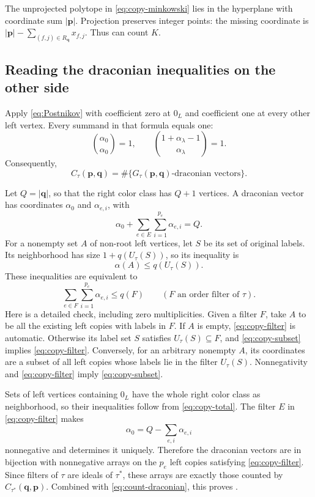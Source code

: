 \documentclass[11pt,letterpaper]{article}
\theoremstyle{definition}
\newcommand{\pvec}{\mathbf p}
\newcommand{\qvec}{\mathbf q}
\newcommand{\sumv}[1]{\lvert #1\rvert}
\begin{document}
The unprojected polytope in \eqref{eq:copy-minkowski} lies in the hyperplane
with coordinate sum $\sumv{\pvec}$. Projection preserves integer points:
the missing coordinate is
$\sumv{\pvec}-\sum_{(f,j)\in R_{\qvec}}x_{f,j}$.
Thus  can count $K$.

\subsection{Reading the draconian inequalities on the other side}
Apply \eqref{eq:Postnikov} with coefficient zero at $0_L$ and coefficient
one at every other left vertex. Every summand in that formula equals one:
\[
 \binom{\alpha_0}{\alpha_0}=1,\qquad
 \binom{1+\alpha_\lambda-1}{\alpha_\lambda}=1.
\]
Consequently,
\begin{equation}\label{eq:count-draconian}
 C_\tau(\pvec,\qvec)=\#\{G_\tau(\pvec,\qvec)\text{-draconian vectors}\}.
\end{equation}

Let $Q=\sumv{\qvec}$, so that the right color class has $Q+1$ vertices.
A draconian vector has coordinates
$\alpha_0$ and $\alpha_{e,i}$, with
\begin{equation}\label{eq:copy-total}
 \alpha_0+\sum_{e\in E}\sum_{i=1}^{p_e}\alpha_{e,i}=Q.
\end{equation}
For a nonempty set $A$ of non-root left vertices, let $S$ be its set of
original labels. Its neighborhood has size
$1+q(U_\tau(S))$, so its inequality is
\begin{equation}\label{eq:copy-subset}
 \alpha(A)\leq q(U_\tau(S)).
\end{equation}
These inequalities are equivalent to
\begin{equation}\label{eq:copy-filter}
 \sum_{e\in F}\sum_{i=1}^{p_e}\alpha_{e,i}\leq q(F)
 \qquad(F\text{ an order filter of }\tau).
\end{equation}
Here is a detailed check, including zero multiplicities. Given a filter $F$,
take $A$ to be all the existing left copies with labels in $F$. If $A$ is
empty, \eqref{eq:copy-filter} is automatic. Otherwise its label set $S$
satisfies $U_\tau(S)\subseteq F$, and
\eqref{eq:copy-subset} implies \eqref{eq:copy-filter}. Conversely, for an
arbitrary nonempty $A$, its coordinates are a subset of all left copies
whose labels lie in the filter $U_\tau(S)$. Nonnegativity and
\eqref{eq:copy-filter} imply \eqref{eq:copy-subset}.

Sets of left vertices containing $0_L$ have the whole right color class as
neighborhood, so their inequalities follow from \eqref{eq:copy-total}.
The filter $E$ in \eqref{eq:copy-filter} makes
\[
 \alpha_0=Q-\sum_{e,i}\alpha_{e,i}
\]
nonnegative and determines it uniquely. Therefore the draconian vectors
are in bijection with nonnegative arrays on the $p_e$ left copies satisfying
\eqref{eq:copy-filter}. Since filters of $\tau$ are ideals of $\tau^*$,
these arrays are exactly those counted by
$C_{\tau^*}(\qvec,\pvec)$. Combined with
\eqref{eq:count-draconian}, this proves .
\end{document}
